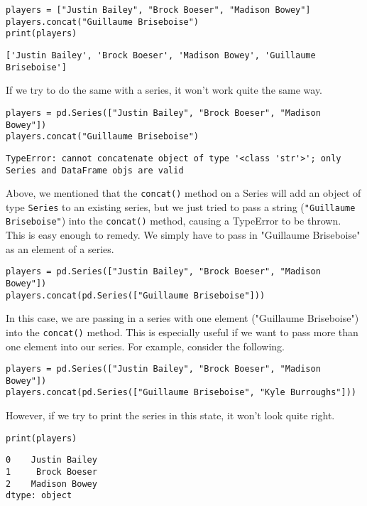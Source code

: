 \begin{lstlisting}[style=pippython]
players = ["Justin Bailey", "Brock Boeser", "Madison Bowey"]
players.concat("Guillaume Briseboise")
print(players)
\end{lstlisting}
\begin{lstlisting}[style=none]
['Justin Bailey', 'Brock Boeser', 'Madison Bowey', 'Guillaume Briseboise']
\end{lstlisting}
If we try to do the same with a  series, it won't work quite the same way.
\begin{lstlisting}[style=pippython]
players = pd.Series(["Justin Bailey", "Brock Boeser", "Madison Bowey"])
players.concat("Guillaume Briseboise")
\end{lstlisting}
\begin{lstlisting}[style=none]
TypeError: cannot concatenate object of type '<class 'str'>'; only Series and DataFrame objs are valid
\end{lstlisting}
Above, we mentioned that the \verb|concat()| method on a Series will add an object of type \verb|Series| to an existing series, but we just tried to pass a string (\verb|"Guillaume Briseboise"|) into the \verb|concat()| method, causing a TypeError to be thrown. This is easy enough to remedy. We simply have to pass in "Guillaume Briseboise" as an element of a  series.
\begin{lstlisting}[style=pippython]
players = pd.Series(["Justin Bailey", "Brock Boeser", "Madison Bowey"])
players.concat(pd.Series(["Guillaume Briseboise"]))
\end{lstlisting}
In this case, we are passing in a  series with one element ("Guillaume Briseboise") into the \verb|concat()| method. This is especially useful if we want to pass more than one element into our series. For example, consider the following.
\begin{lstlisting}[style=pippython]
players = pd.Series(["Justin Bailey", "Brock Boeser", "Madison Bowey"])
players.concat(pd.Series(["Guillaume Briseboise", "Kyle Burroughs"]))
\end{lstlisting}
However, if we try to print the series in this state, it won't look quite right.
\begin{lstlisting}[style=pippython]
print(players)
\end{lstlisting}
\begin{lstlisting}[style=none]
0    Justin Bailey
1     Brock Boeser
2    Madison Bowey
dtype: object
\end{lstlisting}
